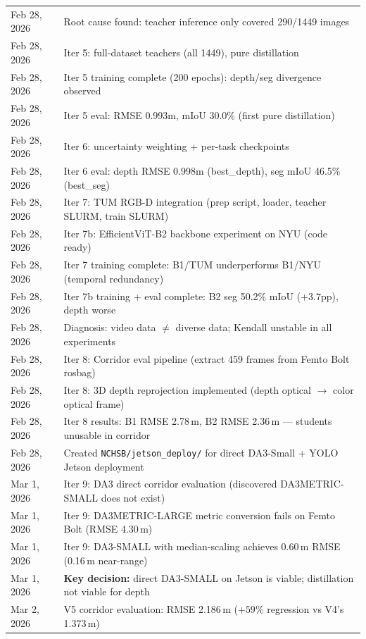 \documentclass[11pt,a4paper]{article}
\begin{document}
\begin{longtable}{lp{10cm}}
Feb 28, 2026 & Root cause found: teacher inference only covered 290/1449 images \\
Feb 28, 2026 & Iter 5: full-dataset teachers (all 1449), pure distillation \\
Feb 28, 2026 & Iter 5 training complete (200 epochs): depth/seg divergence observed \\
Feb 28, 2026 & Iter 5 eval: RMSE 0.993m, mIoU 30.0\% (first pure distillation) \\
Feb 28, 2026 & Iter 6: uncertainty weighting + per-task checkpoints \\
Feb 28, 2026 & Iter 6 eval: depth RMSE 0.998m (best\_depth), seg mIoU 46.5\% (best\_seg) \\
Feb 28, 2026 & Iter 7: TUM RGB-D integration (prep script, loader, teacher SLURM, train SLURM) \\
Feb 28, 2026 & Iter 7b: EfficientViT-B2 backbone experiment on NYU (code ready) \\
Feb 28, 2026 & Iter 7 training complete: B1/TUM underperforms B1/NYU (temporal redundancy) \\
Feb 28, 2026 & Iter 7b training + eval complete: B2 seg 50.2\% mIoU ($+3.7$pp), depth worse \\
Feb 28, 2026 & Diagnosis: video data $\neq$ diverse data; Kendall unstable in all experiments \\
Feb 28, 2026 & Iter 8: Corridor eval pipeline (extract 459 frames from Femto Bolt rosbag) \\
Feb 28, 2026 & Iter 8: 3D depth reprojection implemented (depth optical $\to$ color optical frame) \\
Feb 28, 2026 & Iter 8 results: B1 RMSE 2.78\,m, B2 RMSE 2.36\,m --- students unusable in corridor \\
Feb 28, 2026 & Created \texttt{NCHSB/jetson\_deploy/} for direct DA3-Small + YOLO Jetson deployment \\
Mar 1, 2026  & Iter 9: DA3 direct corridor evaluation (discovered DA3METRIC-SMALL does not exist) \\
Mar 1, 2026  & Iter 9: DA3METRIC-LARGE metric conversion fails on Femto Bolt (RMSE 4.30\,m) \\
Mar 1, 2026  & Iter 9: DA3-SMALL with median-scaling achieves 0.60\,m RMSE (0.16\,m near-range) \\
Mar 1, 2026  & \textbf{Key decision:} direct DA3-SMALL on Jetson is viable; distillation not viable for depth \\
Mar 2, 2026  & V5 corridor evaluation: RMSE 2.186\,m ($+59\%$ regression vs V4's 1.373\,m) \\

\end{longtable}
\end{document}
